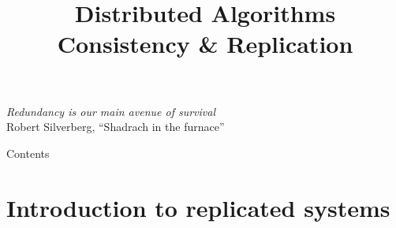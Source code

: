 
\title[DS - Replication]{\textbf{Distributed Algorithms}\\Consistency \& Replication}



\newcommand{\REQ}{\textsc{req}}
\newcommand{\REP}{\textsc{rep}}
\newcommand{\NEWP}{\textsc{newp}}
\newcommand{\STATE}{\textsc{state}}
\newcommand{\ACK}{\textsc{state}}
\newcommand{\State}{\mathit{state}}
\newcommand{\Responses}{\mathit{response}}
\newcommand{\Id}{\mathit{id}}
\newcommand{\Servers}{\mathit{servers}}
\newcommand{\Update}{\mathsf{update}}
\newcommand{\Reply}{\mathsf{reply}}
\newcommand{\NewId}{\mathsf{newId}}
\newcommand{\Operation}{\mathsf{operation}}
\newcommand{\isPrimary}{\mathit{primary}}


\begin{frame}
\titlepage

\begin{flushright}
{\em Redundancy is our main avenue of survival} \\
Robert Silverberg, ``Shadrach in the furnace''
\end{flushright}


\invisible{{\tiny

 
}}


\end{frame}

\begin{frame}[shrink]{Contents}
\tableofcontents
\end{frame}

\section{Introduction to replicated systems}


